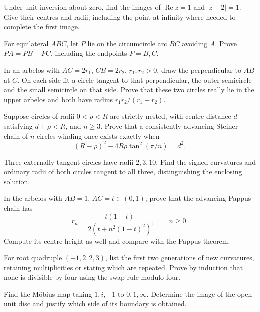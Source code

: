 \begin{exercise}[$\star$]\label{geometry:ex:invline}
Under unit inversion about zero, find the images of $\operatorname{Re}z=1$ and $|z-2|=1$. Give their centres and radii, including the point at infinity where needed to complete the first image.
\end{exercise}
\begin{exercise}[$\star$]\label{geometry:ex:vanschooten}
For equilateral $ABC$, let $P$ lie on the circumcircle arc $BC$ avoiding $A$. Prove $PA=PB+PC$, including the endpoints $P=B,C$.
\end{exercise}
\begin{exercise}[$\star\star$]\label{geometry:ex:twins}
In an arbelos with $AC=2r_1$, $CB=2r_2$, $r_1,r_2>0$, draw the perpendicular to $AB$ at $C$. On each side fit a circle tangent to that perpendicular, the outer semicircle and the small semicircle on that side. Prove that these two circles really lie in the upper arbelos and both have radius $r_1r_2/(r_1+r_2)$.
\end{exercise}
\begin{exercise}[$\star\star$]\label{geometry:ex:steinerformula}
Suppose circles of radii $0<\rho<R$ are strictly nested, with centre distance $d$ satisfying $d+\rho<R$, and $n\ge3$. Prove that a consistently advancing Steiner chain of $n$ circles winding once exists exactly when
\[
(R-\rho)^2-4R\rho\tan^2(\pi/n)=d^2.
\]
\end{exercise}
\begin{exercise}[$\star$]\label{geometry:ex:soddy}
Three externally tangent circles have radii $2,3,10$. Find the signed curvatures and ordinary radii of both circles tangent to all three, distinguishing the enclosing solution.
\end{exercise}
\begin{exercise}[$\star\star$]\label{geometry:ex:pappusradius}
In the arbelos with $AB=1$, $AC=t\in(0,1)$, prove that the advancing Pappus chain has
\[
r_n=\frac{t(1-t)}{2(t+n^2(1-t)^2)},\qquad n\ge0.
\]
Compute its centre height as well and compare with the Pappus theorem.
\end{exercise}
\begin{exercise}[$\star$]\label{geometry:ex:gasketroot}
For root quadruple $(-1,2,2,3)$, list the first two generations of new curvatures, retaining multiplicities or stating which are repeated. Prove by induction that none is divisible by four using the swap rule modulo four.
\end{exercise}
\begin{exercise}[$\star$]\label{geometry:ex:mobius3}
Find the M\"obius map taking $1,i,-1$ to $0,1,\infty$. Determine the image of the open unit disc and justify which side of its boundary is obtained.
\end{exercise}
